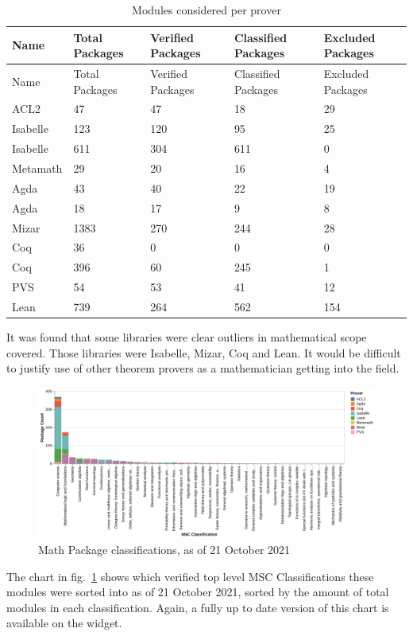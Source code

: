 \documentclass[
]{article}
\begin{document}
\hypertarget{tbl:package_results}{}
\begin{longtable}[]{@{}lllll@{}}
\caption{\label{tbl:package_results}Modules considered per
prover}\tabularnewline
\toprule
Name & Total Packages & Verified Packages & Classified Packages &
Excluded Packages \\
\midrule
\endfirsthead
\toprule
Name & Total Packages & Verified Packages & Classified Packages &
Excluded Packages \\
\midrule
\endhead
ACL2 & 47 & 47 & 18 & 29 \\
Isabelle & 123 & 120 & 95 & 25 \\
Isabelle & 611 & 304 & 611 & 0 \\
Metamath & 29 & 20 & 16 & 4 \\
Agda & 43 & 40 & 22 & 19 \\
Agda & 18 & 17 & 9 & 8 \\
Mizar & 1383 & 270 & 244 & 28 \\
Coq & 36 & 0 & 0 & 0 \\
Coq & 396 & 60 & 245 & 1 \\
PVS & 54 & 53 & 41 & 12 \\
Lean & 739 & 264 & 562 & 154 \\
\bottomrule
\end{longtable}

It was found that some libraries were clear outliers in mathematical
scope covered. Those libraries were Isabelle, Mizar, Coq and Lean. It
would be difficult to justify use of other theorem provers as a
mathematician getting into the field.

\begin{figure}
\hypertarget{fig:math_classifications}{%
\centering
\includegraphics{./Images/MathClassification.png}
\caption{Math Package classifications, as of 21 October
2021}\label{fig:math_classifications}
}
\end{figure}

The chart in fig.~\ref{fig:math_classifications} shows which verified
top level MSC Classifications these modules were sorted into as of 21
October 2021, sorted by the amount of total modules in each
classification. Again, a fully up to date version of this chart is
available on the widget.
\end{document}

